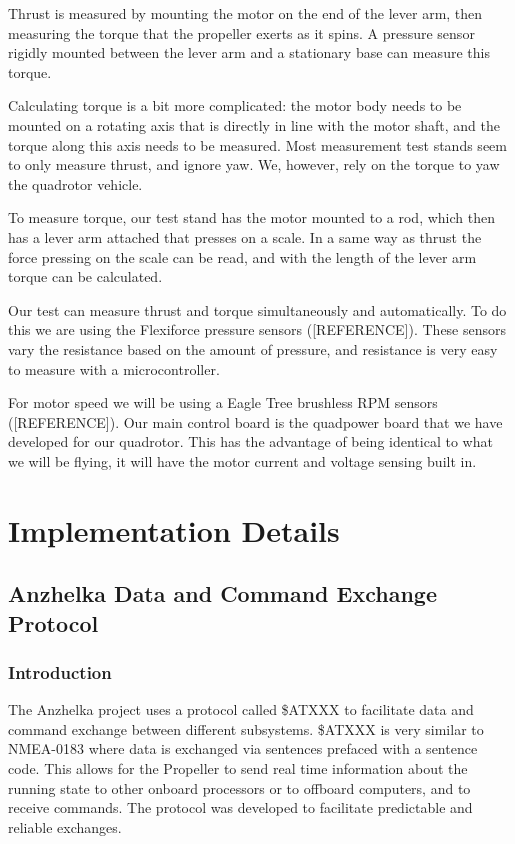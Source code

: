\documentclass{article}
\numberwithin{equation}{section} %
\begin{document}
Thrust is measured by mounting the motor on the end of the lever arm, then measuring the torque that the propeller exerts as it spins. A pressure sensor rigidly mounted between the lever arm and a stationary base can measure this torque.

Calculating torque is a bit more complicated: the motor body needs to be mounted on a rotating axis that is directly in line with the motor shaft, and the torque along this axis needs to be measured. Most measurement test stands seem to only measure thrust, and ignore yaw. We, however, rely on the torque to yaw the quadrotor vehicle.

To measure torque, our test stand has the motor mounted to a rod, which then has a lever arm attached that presses on a scale. In a same way as thrust the force pressing on the scale can be read, and with the length of the lever arm torque can be calculated.

Our test can measure thrust and torque simultaneously and automatically. To do this we are using the Flexiforce pressure sensors ([REFERENCE]). These sensors vary the resistance based on the amount of pressure, and resistance is very easy to measure with a microcontroller.

For motor speed we will be using a Eagle Tree brushless RPM sensors ([REFERENCE]). Our main control board is the quadpower board that we have developed for our quadrotor. This has the advantage of being identical to what we will be flying, it will have the motor current and voltage sensing built in.



\section{Implementation Details}

\subsection{Anzhelka Data and Command Exchange Protocol}

\subsubsection{Introduction}
The Anzhelka project uses a protocol called \$ATXXX to facilitate data and command exchange between different subsystems. \$ATXXX is very similar to NMEA-0183 where data is exchanged via sentences prefaced with a sentence code. This allows for the Propeller to send real time information about the running state to other onboard processors or to offboard computers, and to receive commands. The protocol was developed to facilitate predictable and reliable exchanges.
\end{document}

